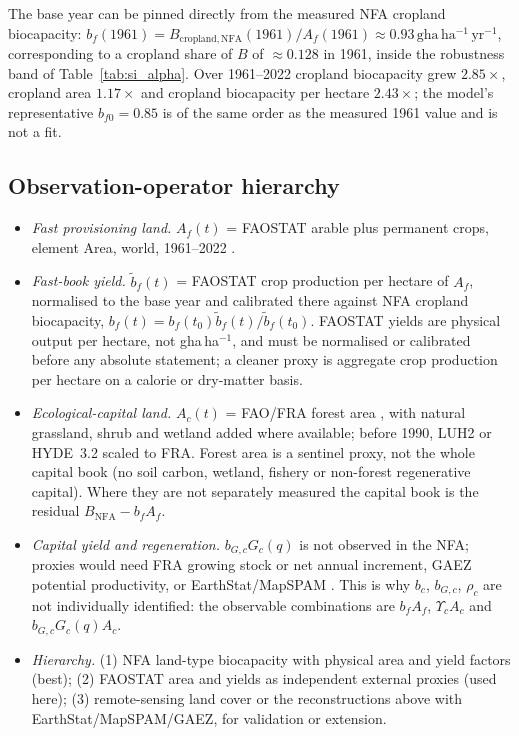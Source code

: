 \documentclass[11pt,a4paper]{article}
\newcommand{\Ups}{\Upsilon_c}
\begin{document}
The base year can be pinned directly from the measured NFA cropland biocapacity: $b_f(1961)=B_{\mathrm{cropland,NFA}}(1961)/A_f(1961)\approx0.93\,\mathrm{gha\,ha^{-1}\,yr^{-1}}$, corresponding to a cropland share of $B$ of $\approx0.128$ in 1961, inside the robustness band of Table~\ref{tab:si_alpha}. Over 1961--2022 cropland biocapacity grew $2.85\times$, cropland area $1.17\times$ and cropland biocapacity per hectare $2.43\times$; the model's representative $b_{f0}=0.85$ is of the same order as the measured 1961 value and is not a fit.

\subsection{Observation-operator hierarchy}\label{si:operator}

\begin{itemize}[leftmargin=1.5em]
\item \emph{Fast provisioning land.} $A_f(t)$ = FAOSTAT arable plus permanent crops, element Area, world, 1961--2022 \citep{FAO2023}.
\item \emph{Fast-book yield.} $\tilde b_f(t)$ = FAOSTAT crop production per hectare of $A_f$, normalised to the base year and calibrated there against NFA cropland biocapacity, $b_f(t)=b_f(t_0)\tilde b_f(t)/\tilde b_f(t_0)$. FAOSTAT yields are physical output per hectare, not gha\,ha$^{-1}$, and must be normalised or calibrated before any absolute statement; a cleaner proxy is aggregate crop production per hectare on a calorie or dry-matter basis.
\item \emph{Ecological-capital land.} $A_c(t)$ = FAO/FRA forest area \citep{FAO2020}, with natural grassland, shrub and wetland added where available; before 1990, LUH2 \citep{Hurtt2011} or HYDE~3.2 \citep{KleinGoldewijk2017} scaled to FRA. Forest area is a sentinel proxy, not the whole capital book (no soil carbon, wetland, fishery or non-forest regenerative capital). Where they are not separately measured the capital book is the residual $B_{\mathrm{NFA}}-b_fA_f$.
\item \emph{Capital yield and regeneration.} $b_{G,c}G_c(q)$ is not observed in the NFA; proxies would need FRA growing stock or net annual increment, GAEZ potential productivity, or EarthStat/MapSPAM \citep{Monfreda2008}. This is why $b_c$, $b_{G,c}$, $\rho_c$ are not individually identified: the observable combinations are $b_fA_f$, $\Ups A_c$ and $b_{G,c}G_c(q)A_c$.
\item \emph{Hierarchy.} (1) NFA land-type biocapacity with physical area and yield factors (best); (2) FAOSTAT area and yields as independent external proxies (used here); (3) remote-sensing land cover \citep{ESA2017,Copernicus2019} or the reconstructions above with EarthStat/MapSPAM/GAEZ, for validation or extension.
\end{itemize}
\end{document}
